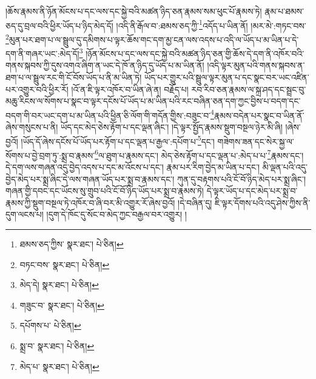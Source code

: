 །ཆོས་རྣམས་ནི་ཉོན་མོངས་པ་དང་ལས་དང་སྐྱེ་བའི་མཚན་ཉིད་ཅན་རྣམས་སམ་ཕུང་པོ་རྣམས་ཏེ། རྣམ་པ་ཐམས་ཅད་དུ་བྲལ་བའི་ཕྱིར་ཡོད་པ་ཉིད་མེད་དོ། །འདི་ནི་རྒོལ་བ་:ཐམས་ཅད་ཀྱི་\footnote{ཐམས་ཅད་ཀྱིས་  སྣར་ཐང་།  པེ་ཅིན། }འདོད་པ་ཡིན་ནོ། །མར་མེ་:གཏང་བས་\footnote{བཏང་བས་  སྣར་ཐང་།  པེ་ཅིན། }མུན་པར་ཐག་པ་ལ་སྦྲུལ་དུ་དམིགས་པ་ལྟར་ཆོས་གང་དག་མྱ་ངན་ལས་འདས་པ་འདི་ལ་ཡོད་པ་མ་ཡིན་པ་དེ་དག་ནི་གཞར་ཡང་:མེད་དོ།\footnote{མེད་དེ།  སྣར་ཐང་།  པེ་ཅིན། } །ཉོན་མོངས་པ་དང་ལས་དང་སྐྱེ་བའི་མཚན་ཉིད་ཅན་གྱི་ཆོས་དེ་དག་ནི་འཁོར་བའི་གནས་སྐབས་ཀྱི་དུས་འགའ་ཞིག་ན་ཡང་དེ་ཁོ་ན་ཉིད་དུ་ཡོད་པ་མ་ཡིན་ནོ། །འདི་ལྟར་མུན་པའི་གནས་སྐབས་ན་ཐག་པ་ལ་སྦྲུལ་རང་གི་ངོ་བོས་ཡོད་པ་ནི་མ་ཡིན་ཏེ། ཡོད་པར་གྱུར་པའི་སྦྲུལ་ལྟར་མུན་པ་དང་སྣང་བར་ཡང་འཛིན་པར་འགྱུར་བའི་ཕྱིར་རོ། །འོ་ན་ཇི་ལྟར་འཁོར་བ་ཡིན་ཞེ་ན། བརྗོད་པ། རབ་རིབ་ཅན་རྣམས་ལ་སྐྲ་ཤད་དང་སྦྲང་བུ་མཆུ་རིངས་ལ་སོགས་པ་སྣང་བ་ལྟར་དངོས་པོ་ཡོད་པ་མ་ཡིན་པའི་རང་བཞིན་ཅན་དག་ཀྱང་བྱིས་པ་བདག་དང་བདག་གི་བར་ཡང་དག་པ་མ་ཡིན་པའི་ཕྱིན་ཅི་ལོག་གི་གདོན་གྱིས་:བཟུང་བ་\footnote{གཟུང་བ་  སྣར་ཐང་།  པེ་ཅིན། }རྣམས་བདེན་པར་སྣང་བ་ཡིན་ནོ་ཞེས་གསུངས་པ་ནི། ཡོད་དང་མེད་ཅེས་རྟོག་པ་དང་ལྡན་ཞིང་། །དེ་ལྟར་སྤྱོད་རྣམས་སྡུག་བསྔལ་ཉེར་མི་ཞི། །ཞེས་བྱའོ། །ཡོད་དོ་ཞེས་དངོས་པོ་ཡོད་པར་རྟོག་པ་དང་ལྡན་པ་རྒྱལ་:དཔོག་པ་\footnote{དཔོགས་པ་  པེ་ཅིན། }དང་། གཟེགས་ཟན་དང་སེར་སྐྱ་ལ་སོགས་པ་བྱེ་བྲག་ཏུ་:སྨྲ་བ་རྣམས་\footnote{སྨྲ་བ་  སྣར་ཐང་།  པེ་ཅིན། }ལ་ཐུག་པ་རྣམས་དང་། མེད་ཅེས་རྟོག་པ་དང་ལྡན་པ་:མེད་པ་པ་\footnote{མེད་པ་  སྣར་ཐང་།  པེ་ཅིན། }རྣམས་དང་། དེ་དག་ལས་གཞན་འདུ་བྱེད་འདས་པ་དང་མ་འོངས་པ་དང་། རྣམ་པར་རིག་བྱེད་མ་ཡིན་པ་དང་། མི་ལྡན་པའི་འདུ་བྱེད་མེད་པར་སྨྲ་ཞིང་དེ་ལས་གཞན་ཡོད་པར་སྨྲ་བ་རྣམས་དང་། ཀུན་དུ་བརྟགས་པའི་ངོ་བོ་ཉིད་མེད་པར་སྨྲ་ཞིང་། གཞན་གྱི་དབང་དང་ཡོངས་སུ་གྲུབ་པའི་ངོ་བོ་ཉིད་ཡོད་པར་སྨྲ་བ་རྣམས་ཏེ། དེ་ལྟར་ཡོད་པ་དང་མེད་པར་སྨྲ་བ་རྣམས་ཀྱི་སྡུག་བསྔལ་ཏེ་འཁོར་བ་ཞི་བར་མི་འགྱུར་རོ་ཞེས་བྱའོ། །དེ་བཞིན་དུ། ཇི་ལྟར་དོགས་པའི་འདུ་ཤེས་ཀྱིས་ནི་དུག་ལངས་པ། །དུག་དེ་ཁོང་དུ་སོང་བ་མེད་ཀྱང་བརྒྱལ་བར་འགྱུར། །
